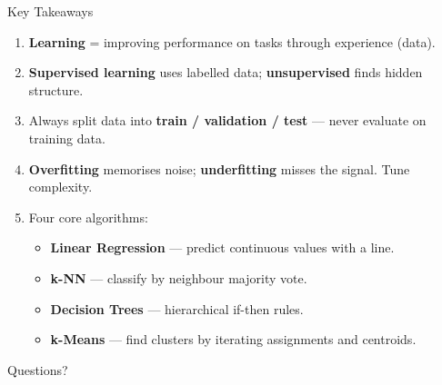 \documentclass[10pt]{beamer}
\begin{document}
\begin{frame}{Key Takeaways}
    \begin{enumerate}
        \item \textbf{Learning} = improving performance on tasks through experience (data).
        \item \textbf{Supervised learning} uses labelled data; \textbf{unsupervised} finds hidden structure.
        \item Always split data into \textbf{train / validation / test} — never evaluate on training data.
        \item \textbf{Overfitting} memorises noise; \textbf{underfitting} misses the signal. Tune complexity.
        \item Four core algorithms:
        \begin{itemize}
            \item \textbf{Linear Regression} — predict continuous values with a line.
            \item \textbf{k-NN} — classify by neighbour majority vote.
            \item \textbf{Decision Trees} — hierarchical if-then rules.
            \item \textbf{k-Means} — find clusters by iterating assignments and centroids.
        \end{itemize}
    \end{enumerate}
\end{frame}

\begin{frame}[standout]
    Questions?
\end{frame}
\end{document}
